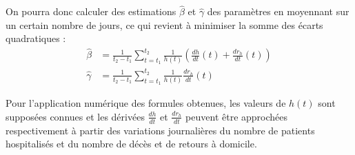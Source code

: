 \documentclass[12pt]{extarticle}
\begin{document}
On pourra donc calculer des estimations $\hat\beta$ et $\hat\gamma$ des paramètres en moyennant sur un certain nombre de jours, ce qui revient à minimiser la somme des écarts quadratiques : 
\begin{align*}
    \hat\beta &= \frac{1}{t_2 - t_1}\sum_{t = t_1}^{t_2}\frac{1}{h(t)}(\frac{dh}{dt}(t) + \frac{dr_h}{dt}(t))\\
    \hat\gamma &= \frac{1}{t_2 - t_1}\sum_{t = t_1}^{t_2}\frac{1}{h(t)}\frac{dr_h}{dt}(t)
\end{align*}

Pour l'application numérique des formules obtenues, les valeurs de $h(t)$ sont supposées connues et les dérivées $\frac{dh}{dt}$ et $\frac{dr_h}{dt}$ peuvent être approchées respectivement à partir des variations journalières du nombre de patients hospitalisés et du nombre de décès et de retours à domicile.
\end{document}
